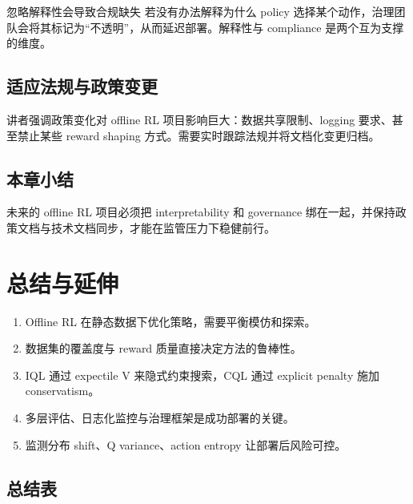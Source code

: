 \documentclass[a4paper]{article}
\begin{document}
\begin{warningbox}{忽略解释性会导致合规缺失}
若没有办法解释为什么 policy 选择某个动作，治理团队会将其标记为“不透明”，从而延迟部署。解释性与 compliance 是两个互为支撑的维度。
\end{warningbox}

\subsection{适应法规与政策变更}

讲者强调政策变化对 offline RL 项目影响巨大：数据共享限制、logging 要求、甚至禁止某些 reward shaping 方式。需要实时跟踪法规并将文档化变更归档。

\subsection{本章小结}

未来的 offline RL 项目必须把 interpretability 和 governance 绑在一起，并保持政策文档与技术文档同步，才能在监管压力下稳健前行。

\section{总结与延伸}

\begin{enumerate}
    \item Offline RL 在静态数据下优化策略，需要平衡模仿和探索。
    \item 数据集的覆盖度与 reward 质量直接决定方法的鲁棒性。
    \item IQL 通过 expectile V 来隐式约束搜索，CQL 通过 explicit penalty 施加 conservatism。
    \item 多层评估、日志化监控与治理框架是成功部署的关键。
    \item 监测分布 shift、Q variance、action entropy 让部署后风险可控。
\end{enumerate}

\subsection{总结表}
\end{document}
